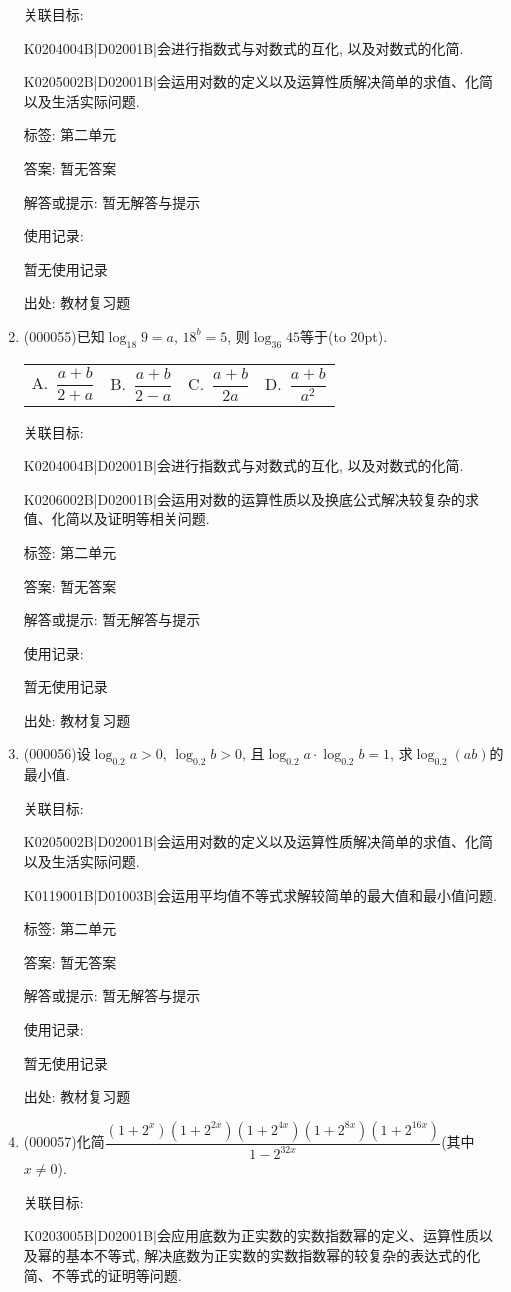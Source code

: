 \documentclass[10pt,a4paper]{article}
\newcommand{\bracket}[1]{(\hbox to #1pt{})}
\newcommand{\fourch}[4]{\par\begin{tabular}{p{.23\textwidth}p{.23\textwidth}p{.23\textwidth}p{.23\textwidth}}
A.~#1 &B.~#2& C.~#3& D.~#4
\end{tabular}}
\begin{document}
\begin{enumerate}[1.]
关联目标:

K0204004B|D02001B|会进行指数式与对数式的互化, 以及对数式的化简.

K0205002B|D02001B|会运用对数的定义以及运算性质解决简单的求值、化简以及生活实际问题.



标签: 第二单元

答案: 暂无答案

解答或提示: 暂无解答与提示

使用记录:

暂无使用记录


出处: 教材复习题
\item { (000055)}已知$\log_{18}9=a$, $18^b=5$, 则$\log_{36}45$等于\bracket{20}.
\fourch{$\dfrac{a+b}{2+a}$}{$\dfrac{a+b}{2-a}$}{$\dfrac{a+b}{2a}$}{$\dfrac{a+b}{a^2}$}


关联目标:

K0204004B|D02001B|会进行指数式与对数式的互化, 以及对数式的化简.

K0206002B|D02001B|会运用对数的运算性质以及换底公式解决较复杂的求值、化简以及证明等相关问题.



标签: 第二单元

答案: 暂无答案

解答或提示: 暂无解答与提示

使用记录:

暂无使用记录


出处: 教材复习题
\item { (000056)}设$\log_{0.2}a>0$, $\log_{0.2}b>0$, 且$\log_{0.2}a\cdot \log_{0.2}b=1$, 求$\log_{0.2}(ab)$的最小值.


关联目标:

K0205002B|D02001B|会运用对数的定义以及运算性质解决简单的求值、化简以及生活实际问题.

K0119001B|D01003B|会运用平均值不等式求解较简单的最大值和最小值问题.



标签: 第二单元

答案: 暂无答案

解答或提示: 暂无解答与提示

使用记录:

暂无使用记录


出处: 教材复习题
\item { (000057)}化简$\dfrac{(1+2^x)(1+2^{2x})(1+2^{4x})(1+2^{8x})(1+2^{16x})}{1-2^{32x}}$(其中$x\ne 0$).


关联目标:

K0203005B|D02001B|会应用底数为正实数的实数指数幂的定义、运算性质以及幂的基本不等式, 解决底数为正实数的实数指数幂的较复杂的表达式的化简、不等式的证明等问题.




\end{enumerate}
\end{document}
